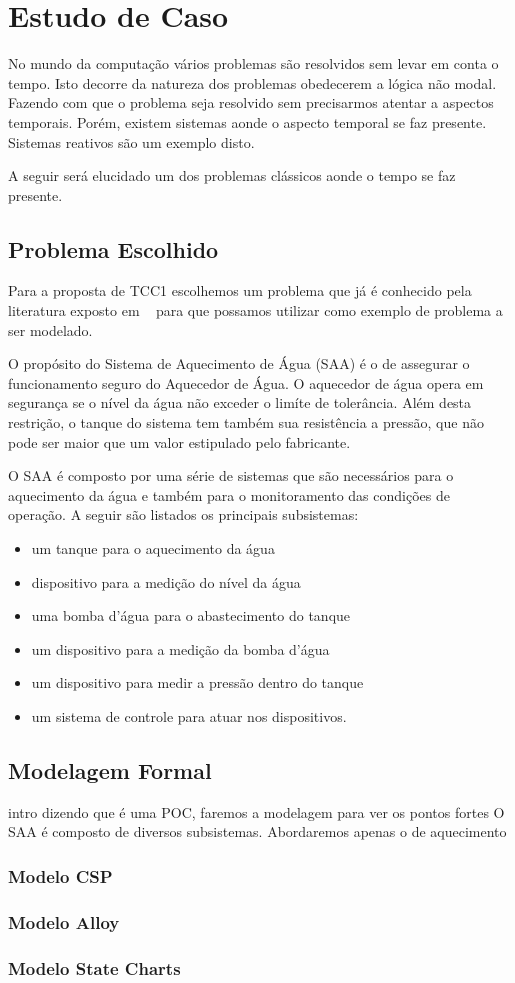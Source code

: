 \section{Estudo de Caso}
No mundo da computação vários problemas são resolvidos sem levar em conta o tempo. 
Isto decorre da natureza dos problemas obedecerem a lógica não modal. Fazendo com que o 
problema seja resolvido sem precisarmos atentar a aspectos temporais. Porém, existem sistemas aonde
o aspecto temporal se faz presente. Sistemas reativos são um exemplo disto.

A seguir será elucidado um dos problemas clássicos aonde o tempo se faz presente.
\subsection{Problema Escolhido}
Para a proposta de TCC1 escolhemos um problema que já é conhecido pela literatura exposto 
em ~\cite{opac-b1092561} para que possamos utilizar como exemplo de problema a ser modelado.

O propósito do Sistema de Aquecimento de Água (SAA) é o de assegurar o funcionamento 
seguro do Aquecedor de Água. O aquecedor de água opera em segurança se o nível da água
não exceder o limíte de tolerância. Além desta restrição, o tanque do sistema tem também 
sua resistência a pressão, que não pode ser maior que um valor estipulado pelo fabricante.

O SAA é composto por uma série de sistemas que são necessários para o aquecimento da água e também
para o monitoramento das condições de operação. A seguir são listados os principais subsistemas:
\begin{itemize}
\item um tanque para o aquecimento da água
\item dispositivo para a medição do nível da água
\item uma bomba d'água para o abastecimento do tanque
\item um dispositivo para a medição da bomba d'água
\item um dispositivo para medir a pressão dentro do tanque
\item um sistema de controle para atuar nos dispositivos.
\end{itemize}

\subsection{Modelagem Formal}
intro dizendo que é uma POC, faremos a modelagem para ver os pontos fortes
O SAA é composto de diversos subsistemas. Abordaremos apenas o de aquecimento
\subsubsection{Modelo CSP}
\subsubsection{Modelo Alloy}
\subsubsection{Modelo State Charts}
